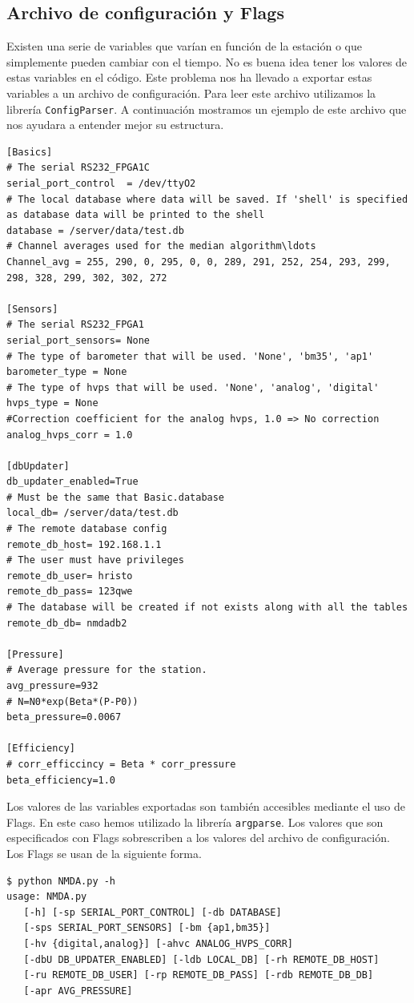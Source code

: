 	\subsection{Archivo de configuración y Flags}
		Existen una serie de variables que varían en función de la estación o que simplemente pueden cambiar con el tiempo. No es buena idea
		tener los valores de estas variables en el código. Este problema nos ha llevado a exportar estas variables a un archivo de
		configuración.  Para leer este archivo utilizamos la librería \texttt{ConfigParser}\cite{py_ConfigParser}. A continuación mostramos un
		ejemplo de este archivo que nos ayudara a entender mejor su estructura.
		\begin{lstlisting}[style=myFile]
[Basics]
# The serial RS232_FPGA1C
serial_port_control  = /dev/ttyO2
# The local database where data will be saved. If 'shell' is specified as database data will be printed to the shell
database = /server/data/test.db
# Channel averages used for the median algorithm\ldots
Channel_avg = 255, 290, 0, 295, 0, 0, 289, 291, 252, 254, 293, 299, 298, 328, 299, 302, 302, 272

[Sensors]
# The serial RS232_FPGA1
serial_port_sensors= None
# The type of barometer that will be used. 'None', 'bm35', 'ap1'
barometer_type = None
# The type of hvps that will be used. 'None', 'analog', 'digital'
hvps_type = None
#Correction coefficient for the analog hvps, 1.0 => No correction
analog_hvps_corr = 1.0

[dbUpdater]
db_updater_enabled=True
# Must be the same that Basic.database
local_db= /server/data/test.db 
# The remote database config
remote_db_host= 192.168.1.1
# The user must have privileges
remote_db_user= hristo
remote_db_pass= 123qwe
# The database will be created if not exists along with all the tables
remote_db_db= nmdadb2

[Pressure]
# Average pressure for the station.
avg_pressure=932
# N=N0*exp(Beta*(P-P0))
beta_pressure=0.0067

[Efficiency]
# corr_efficcincy = Beta * corr_pressure
beta_efficiency=1.0
\end{lstlisting}
		Los valores de las variables exportadas son también accesibles mediante el uso de Flags. En este caso hemos utilizado la librería
		\texttt{argparse}\cite{py_argparse}. Los valores que son especificados con Flags sobrescriben a los valores del archivo de
		configuración. Los Flags se usan de la siguiente forma.
		\begin{lstlisting}[style=myBash]
$ python NMDA.py -h
usage: NMDA.py 
   [-h] [-sp SERIAL_PORT_CONTROL] [-db DATABASE]
   [-sps SERIAL_PORT_SENSORS] [-bm {ap1,bm35}]
   [-hv {digital,analog}] [-ahvc ANALOG_HVPS_CORR]
   [-dbU DB_UPDATER_ENABLED] [-ldb LOCAL_DB] [-rh REMOTE_DB_HOST]
   [-ru REMOTE_DB_USER] [-rp REMOTE_DB_PASS] [-rdb REMOTE_DB_DB]
   [-apr AVG_PRESSURE]
		\end{lstlisting}

